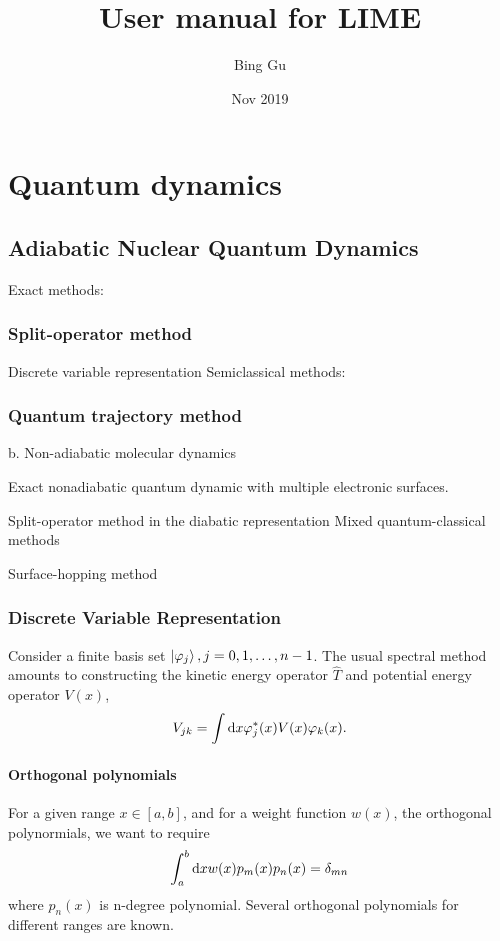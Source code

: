 \documentclass[a4paper,12pt]{book}
\newcommand{\be}{\begin{equation}}
\newcommand{\ee}{\end{equation}}
\begin{document}
\author{Bing Gu}
\title{User manual for LIME}
\date{Nov 2019}

\frontmatter
\maketitle
\tableofcontents

\mainmatter
%
%




\chapter{Quantum dynamics}

\section{ Adiabatic Nuclear Quantum Dynamics}

Exact methods:

\subsection{Split-operator method}
Discrete variable representation
Semiclassical methods:


\subsection{Quantum trajectory method}
b. Non-adiabatic molecular dynamics

Exact nonadiabatic quantum dynamic with multiple electronic surfaces.

Split-operator method in the diabatic representation
Mixed quantum-classical methods

Surface-hopping method

\subsection{Discrete Variable Representation}
Consider a finite basis set $\ket{\varphi_j}, j = 0, 1, \dots, n-1$. The usual spectral method amounts to constructing the kinetic energy operator $\hat{T}$ and potential energy operator $V(x)$,
\be
V_{jk} = \int \dif x {\varphi^*_j(x)}V(x) \varphi_k(x)
.\ee

\subsubsection{Orthogonal polynomials}
For a given range $x \in [a, b]$, and for a weight function $w(x)$, the orthogonal polynormials, we want to require
\be
\int_a^b \dif x w(x)p_m(x)p_n(x) = \delta_{mn}
\ee
where $p_n(x)$ is n-degree polynomial. Several orthogonal polynomials for different ranges are known.
\end{document}
